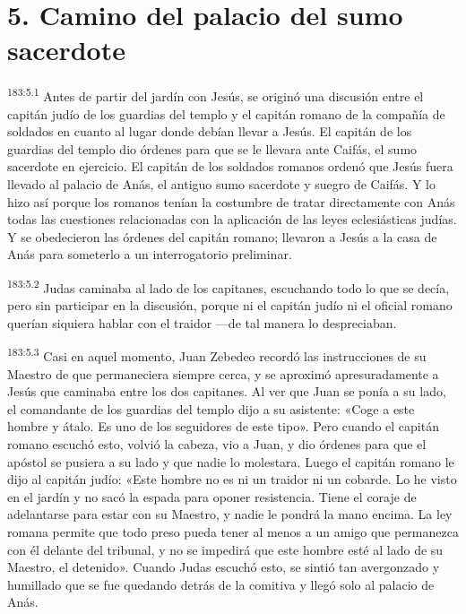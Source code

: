 \section*{5. Camino del palacio del sumo sacerdote}
\par 
\textsuperscript{183:5.1} Antes de partir del jardín con Jesús, se originó una discusión entre el capitán judío de los guardias del templo y el capitán romano de la compañía de soldados en cuanto al lugar donde debían llevar a Jesús. El capitán de los guardias del templo dio órdenes para que se le llevara ante Caifás, el sumo sacerdote en ejercicio. El capitán de los soldados romanos ordenó que Jesús fuera llevado al palacio de Anás, el antiguo sumo sacerdote y suegro de Caifás. Y lo hizo así porque los romanos tenían la costumbre de tratar directamente con Anás todas las cuestiones relacionadas con la aplicación de las leyes eclesiásticas judías. Y se obedecieron las órdenes del capitán romano; llevaron a Jesús a la casa de Anás para someterlo a un interrogatorio preliminar.

\par 
\textsuperscript{183:5.2} Judas caminaba al lado de los capitanes, escuchando todo lo que se decía, pero sin participar en la discusión, porque ni el capitán judío ni el oficial romano querían siquiera hablar con el traidor ---de tal manera lo despreciaban.

\par 
\textsuperscript{183:5.3} Casi en aquel momento, Juan Zebedeo recordó las instrucciones de su Maestro de que permaneciera siempre cerca, y se aproximó apresuradamente a Jesús que caminaba entre los dos capitanes. Al ver que Juan se ponía a su lado, el comandante de los guardias del templo dijo a su asistente: «Coge a este hombre y átalo. Es uno de los seguidores de este tipo». Pero cuando el capitán romano escuchó esto, volvió la cabeza, vio a Juan, y dio órdenes para que el apóstol se pusiera a su lado y que nadie lo molestara. Luego el capitán romano le dijo al capitán judío: «Este hombre no es ni un traidor ni un cobarde. Lo he visto en el jardín y no sacó la espada para oponer resistencia. Tiene el coraje de adelantarse para estar con su Maestro, y nadie le pondrá la mano encima. La ley romana permite que todo preso pueda tener al menos a un amigo que permanezca con él delante del tribunal, y no se impedirá que este hombre esté al lado de su Maestro, el detenido». Cuando Judas escuchó esto, se sintió tan avergonzado y humillado que se fue quedando detrás de la comitiva y llegó solo al palacio de Anás.

